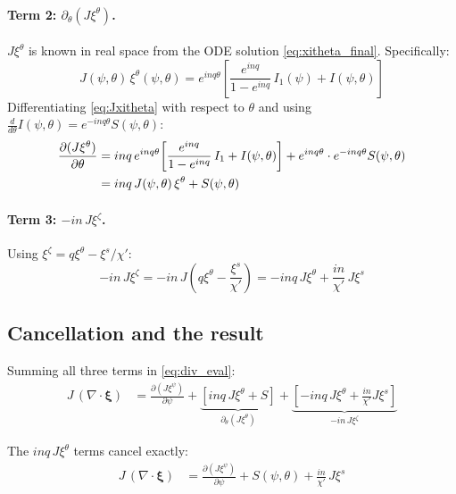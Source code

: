 \documentclass[12pt,a4paper]{article}
\newcommand{\bxi}{\boldsymbol{\xi}}
\begin{document}
\paragraph{Term 2: $\partial_\theta(J\xi^\theta)$.}
$J\xi^\theta$ is known in real space from the ODE solution \eqref{eq:xitheta_final}. Specifically:
\begin{equation}
    J(\psi,\theta)\,\xi^\theta(\psi,\theta) = e^{inq\theta}\!\left[\frac{e^{inq}}{1-e^{inq}}\,I_1(\psi) + I(\psi,\theta)\right]
    \label{eq:Jxitheta}
\end{equation}
Differentiating \eqref{eq:Jxitheta} with respect to $\theta$ and using $\frac{d}{d\theta}I(\psi,\theta) = e^{-inq\theta}S(\psi,\theta)$:
\begin{align}
    \frac{\partial(J\xi^\theta)}{\partial\theta}
    &= inq\,e^{inq\theta}\!\left[\frac{e^{inq}}{1-e^{inq}}\,I_1 + I(\psi,\theta)\right]
    + e^{inq\theta}\cdot e^{-inq\theta}S(\psi,\theta) \notag\\
    &= inq\,J(\psi,\theta)\,\xi^\theta + S(\psi,\theta)
    \label{eq:dJxitheta}
\end{align}

\paragraph{Term 3: $-in\,J\xi^\zeta$.}
Using $\xi^\zeta = q\xi^\theta - \xi^s/\chi'$:
\begin{equation}
    -in\,J\xi^\zeta = -in\,J\!\left(q\xi^\theta - \frac{\xi^s}{\chi'}\right)
    = -inq\,J\xi^\theta + \frac{in}{\chi'}\,J\xi^s
    \label{eq:term3}
\end{equation}

\subsection{Cancellation and the result}

Summing all three terms in \eqref{eq:div_eval}:
\begin{align}
    J\,(\nabla\cdot\bxi) &= \frac{\partial(J\xi^\psi)}{\partial\psi}
    + \underbrace{\left[inq\,J\xi^\theta + S\right]}_{\partial_\theta(J\xi^\theta)}
    + \underbrace{\left[-inq\,J\xi^\theta + \frac{in}{\chi'}J\xi^s\right]}_{-in\,J\xi^\zeta}
\end{align}

The $inq\,J\xi^\theta$ terms cancel exactly:
\begin{align}
    J\,(\nabla\cdot\bxi) &= \frac{\partial(J\xi^\psi)}{\partial\psi}
    + S(\psi,\theta) + \frac{in}{\chi'}\,J\xi^s
\end{align}
\end{document}
